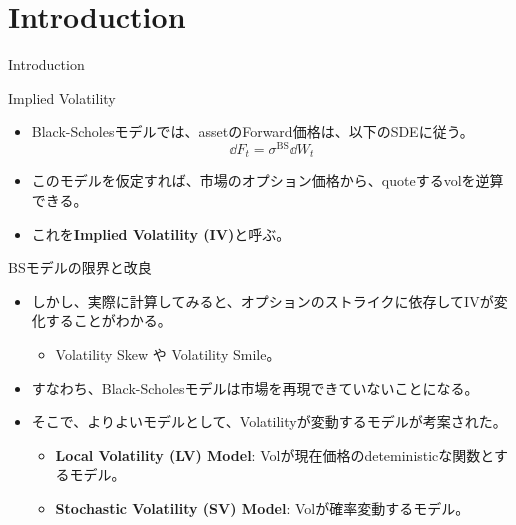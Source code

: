 \documentclass[dvipdfmx,9pt]{beamer}
\begin{document}
\section{Introduction}
\begin{frame}{Introduction}
  \begin{block}{Implied Volatility}
    \begin{itemize}
      \item Black-Scholesモデルでは、assetのForward価格は、以下のSDEに従う。
            \begin{equation}
              \dd F_{t} = \sigma^{\mathrm{BS}} \dd W_{t}
            \end{equation}
      \item このモデルを仮定すれば、市場のオプション価格から、quoteするvolを逆算できる。
      \item これを\textbf{Implied Volatility (IV)}と呼ぶ。
    \end{itemize}
  \end{block}
  \begin{block}{BSモデルの限界と改良}
    \begin{itemize}
      \item しかし、実際に計算してみると、オプションのストライクに依存してIVが変化することがわかる。
            \begin{itemize}
              \item Volatility Skew や Volatility Smile。
            \end{itemize}
      \item すなわち、Black-Scholesモデルは市場を再現できていないことになる。
      \item そこで、よりよいモデルとして、Volatilityが変動するモデルが考案された。
            \begin{itemize}
              \item \textbf{Local Volatility (LV) Model}: Volが現在価格のdeteministicな関数とするモデル。
              \item \textbf{Stochastic Volatility (SV) Model}: Volが確率変動するモデル。
            \end{itemize}
    \end{itemize}
  \end{block}
\end{frame}
\end{document}
